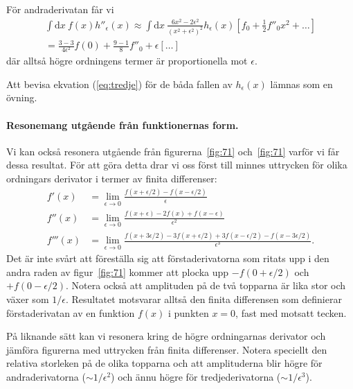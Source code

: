 \documentclass[%
oneside,                 %
final,                   %
10pt]{article}
\newenvironment{doconceexercise}{}{}
\begin{document}
\begin{doconceexercise}
För andraderivatan får vi
\begin{gather}
    \int\mathrm dx\ f(x)h''_\epsilon(x)\approx\int\mathrm dx\ \frac{6x^2-2\epsilon^2}{\left(x^2+\epsilon^2\right)^2}h_\epsilon(x)\left[f_0+\frac12f''_0x^2+\ldots\right] \nonumber\\
    =\frac{3-3}{4\epsilon^2}f(0)+\frac{9-1}8f''_0 + \epsilon [\ldots]
\end{gather}
där alltså högre ordningens termer är proportionella mot $\epsilon$.

Att bevisa ekvation (\ref{eq:tredje}) för de båda fallen av $h_\epsilon(x)$ lämnas som en övning.

\paragraph{Resonemang utgående från funktionernas form.}
Vi kan också resonera utgående från figurerna~\ref{fig:71} och~\ref{fig:71} varför vi får dessa resultat. För att göra detta drar vi oss först till minnes uttrycken för olika ordningars derivator i termer av finita differenser:
\begin{align}
f'(x) &= \lim_{\epsilon \to 0} \frac{f(x+\epsilon/2)-f(x-\epsilon/2)}{\epsilon} \\
f''(x) &= \lim_{\epsilon \to 0} \frac{f(x+\epsilon)-2f(x)+f(x-\epsilon)}{\epsilon^2} \\
f'''(x) &= \lim_{\epsilon \to 0} \frac{f(x+3\epsilon/2)-3f(x+\epsilon/2)+3f(x-\epsilon/2)-f(x-3\epsilon/2)}{\epsilon^3}.
\end{align}
Det är inte svårt att föreställa sig att förstaderivatorna som ritats upp i den andra raden av figur~\ref{fig:71} kommer att plocka upp $-f(0+\epsilon/2)$ och $+f(0-\epsilon/2)$. Notera också att amplituden på de två topparna är lika stor och växer som $1/\epsilon$. Resultatet motsvarar alltså den finita differensen som definierar förstaderivatan av en funktion $f(x)$ i punkten $x=0$, fast med motsatt tecken.

På liknande sätt kan vi resonera kring de högre ordningarnas derivator och jämföra figurerna med uttrycken från finita differenser. Notera speciellt den relativa storleken på de olika topparna och att amplituderna blir högre för andraderivatorna ($\sim 1/\epsilon^2$) och ännu högre för tredjederivatorna ($\sim 1/\epsilon^3$).


\end{doconceexercise}


\end{document}

